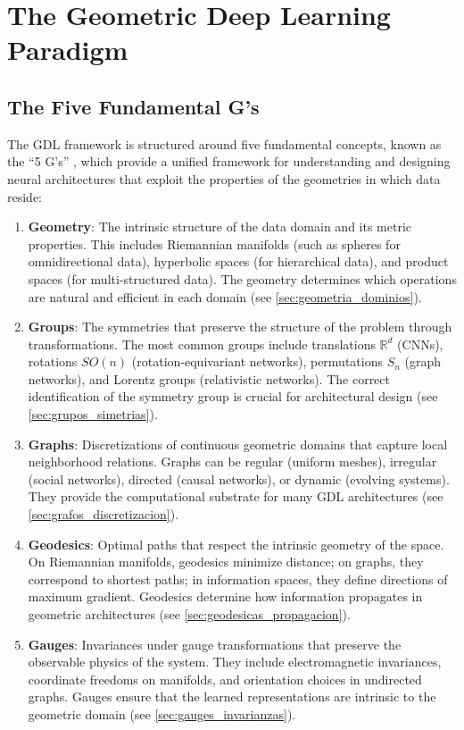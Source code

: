 \section{The Geometric Deep Learning Paradigm}\label{sec:paradigma_gdl}

\subsection{The Five Fundamental G's}\label{subsec:cinco_gs}

The \gls{GDL} framework is structured around five fundamental concepts, known as the ``5 G's'' \citep{bronstein2017geometricdeeplearning}, which provide a unified framework for understanding and designing neural architectures that exploit the properties of the geometries in which data reside:

\begin{enumerate}
    \item \textbf{Geometry}: The intrinsic structure of the data domain and its metric properties. This includes Riemannian manifolds (such as spheres for omnidirectional data), hyperbolic spaces (for hierarchical data), and product spaces (for multi-structured data). The geometry determines which operations are natural and efficient in each domain (see \autoref{sec:geometria_dominios}).

    \item \textbf{Groups}: The symmetries that preserve the structure of the problem through transformations. The most common groups include translations $\mathbb{R}^d$ (\glspl{CNN}), rotations $SO(n)$ (rotation-equivariant networks), permutations $S_n$ (graph networks), and Lorentz groups (relativistic networks). The correct identification of the symmetry group is crucial for architectural design (see \autoref{sec:grupos_simetrias}).

    \item \textbf{Graphs}: Discretizations of continuous geometric domains that capture local neighborhood relations. Graphs can be regular (uniform meshes), irregular (social networks), directed (causal networks), or dynamic (evolving systems). They provide the computational substrate for many \gls{GDL} architectures (see \autoref{sec:grafos_discretizacion}).

    \item \textbf{Geodesics}: Optimal paths that respect the intrinsic geometry of the space. On Riemannian manifolds, geodesics minimize distance; on graphs, they correspond to shortest paths; in information spaces, they define directions of maximum gradient. Geodesics determine how information propagates in geometric architectures (see \autoref{sec:geodesicas_propagacion}).

    \item \textbf{Gauges}: Invariances under gauge transformations that preserve the observable physics of the system. They include electromagnetic invariances, coordinate freedoms on manifolds, and orientation choices in undirected graphs. Gauges ensure that the learned representations are intrinsic to the geometric domain (see \autoref{sec:gauges_invarianzas}).
\end{enumerate}

